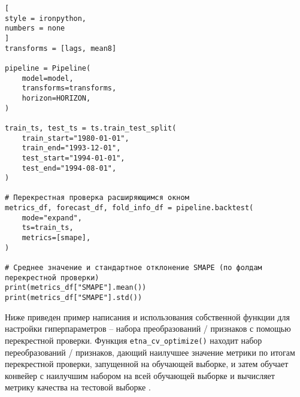 \documentclass[%
	11pt,
	a4paper,
	utf8,
		]{article}
\begin{document}
\begin{lstlisting}[
style = ironpython,
numbers = none
]
transforms = [lags, mean8]

pipeline = Pipeline(
    model=model,
    transforms=transforms,
    horizon=HORIZON,
)

train_ts, test_ts = ts.train_test_split(
    train_start="1980-01-01",
    train_end="1993-12-01",
    test_start="1994-01-01",
    test_end="1994-08-01",
)

# Перекрестная проверка расширяющимся окном
metrics_df, forecast_df, fold_info_df = pipeline.backtest(
    mode="expand",
    ts=train_ts,
    metrics=[smape],
)

# Среднее значение и стандартное отклонение SMAPE (по фолдам перекрестной проверки)
print(metrics_df["SMAPE"].mean())
print(metrics_df["SMAPE"].std())
\end{lstlisting}

Ниже приведен пример написания и использования собственной функции для настройки гиперпараметров -- набора преобразований / признаков с помощью перекрестной проверки. Функция \verb|etna_cv_optimize()| находит набор переобразований / признаков, дающий наилучшее значение метрики по итогам перекрестной проверки, запущенной на обучающей выборке, и затем обучает конвейер с наилучшим набором на всей обучающей выборке и вычисляет метрику качества на тестовой выборке \cite[]{gruzdev:time-series-2022}.
\end{document}
